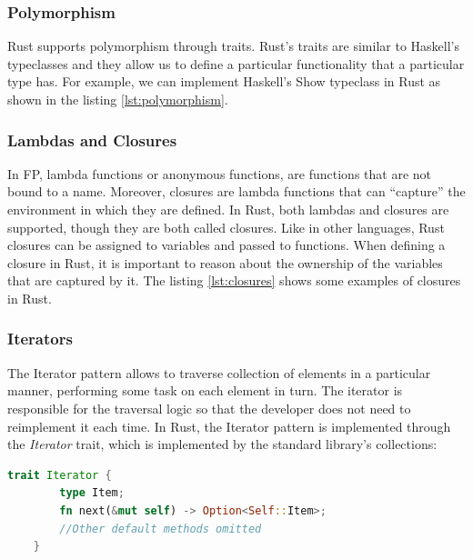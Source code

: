 

\subsubsection{Polymorphism}
Rust supports polymorphism through traits. Rust's traits are similar to Haskell's typeclasses and they allow us to define a particular functionality that a particular type has.
For example, we can implement Haskell's Show typeclass in Rust as shown in the listing \ref{lst:polymorphism}.



\subsubsection{Lambdas and Closures}
In FP, lambda functions or anonymous functions, are functions that are not bound to a name. Moreover, closures are lambda functions that can ``capture'' the environment in which they are defined.
In Rust, both lambdas and closures are supported, though they are both called closures. Like in other languages, Rust closures can be assigned to variables and passed to functions.
When defining a closure in Rust, it is important to reason about the ownership of the variables that are captured by it. The listing \ref{lst:closures} shows some examples of closures in Rust.



\subsubsection{Iterators}
The Iterator pattern allows to traverse collection of elements in a particular manner, performing some task on each element in turn. The iterator is responsible for the traversal logic
so that the developer does not need to reimplement it each time. In Rust, the Iterator pattern is implemented through the \textit{Iterator} trait, which is implemented by the standard library's collections:

\begin{lstlisting}[language=Rust]
    trait Iterator {
        type Item;
        fn next(&mut self) -> Option<Self::Item>;
        //Other default methods omitted
    }
\end{lstlisting}

